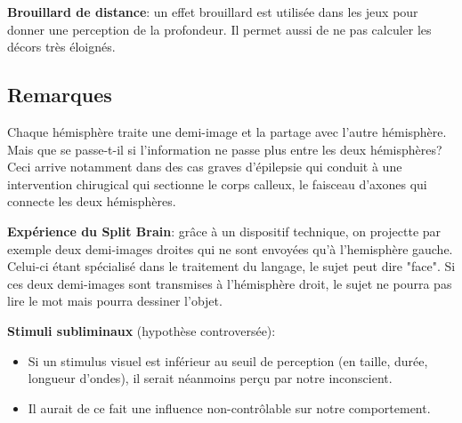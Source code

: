 \textbf{Brouillard de distance}: un effet brouillard est utilis\'ee dans les jeux pour donner une perception de la profondeur. Il permet aussi de ne pas calculer les d\'ecors tr\`es \'eloign\'es.

\subsection{Remarques}

Chaque h\'emisph\`ere traite une demi-image et la partage avec l'autre h\'emisph\`ere. Mais que se passe-t-il si l'information ne passe plus entre les deux h\'emisph\`eres? Ceci arrive notamment dans des cas graves d'\'epilepsie qui conduit \`a une intervention chirugical qui sectionne le corps calleux, le faisceau d'axones qui connecte les deux h\'emisph\`eres.

\begin{figure}[H]
\centering
{}
\end{figure}

\textbf{Exp\'erience du Split Brain}: gr\^ace \`a un dispositif technique, on projectte par exemple deux demi-images droites qui ne sont envoy\'ees qu'\`a l'hemisph\`ere gauche. Celui-ci \'etant sp\'ecialis\'e dans le traitement du langage, le sujet peut dire "face". Si ces deux demi-images sont transmises \`a l'h\'emisph\`ere droit, le sujet ne pourra pas lire le mot mais pourra dessiner l'objet.

\textbf{Stimuli subliminaux} (hypoth\`ese controvers\'ee):
\begin{itemize}
\item Si un stimulus visuel est inf\'erieur au seuil de perception (en taille, dur\'ee, longueur d'ondes), il serait n\'eanmoins per\c{c}u par notre inconscient.
\item Il aurait de ce fait une influence non-contr\^olable sur notre comportement.
\end{itemize}

